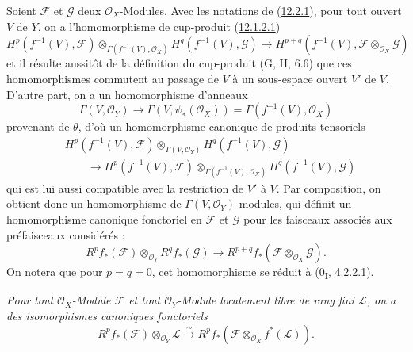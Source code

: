 \begin{env}[12.2.2]
\label{0.12.2.2-fr}
Soient $\mathcal F$ et $\mathcal G$ deux $\mathcal O_X$-Modules. Avec les
notations de (\hyperref[0.12.2.1-fr]{12.2.1}), pour tout ouvert $V$ de $Y$,
on a l'homomorphisme de cup-produit
(\hyperref[0.12.1.2.1-fr]{12.1.2.1})
\[
H^p(f^{-1}(V),\mathcal F)
\otimes_{\Gamma(f^{-1}(V),\mathcal O_X)}
H^q(f^{-1}(V),\mathcal G)
\longrightarrow
H^{p+q}(f^{-1}(V),\mathcal F\otimes_{\mathcal O_X}\mathcal G)
\]
et il résulte aussitôt de la définition du cup-produit (G, II, 6.6) que ces
homomorphismes commutent au passage de $V$ à un sous-espace ouvert $V'$ de
$V$. D'autre part, on a un homomorphisme d'anneaux
\[
\Gamma(V,\mathcal O_Y)\longrightarrow\Gamma(V,\psi_*(\mathcal O_X))
=\Gamma(f^{-1}(V),\mathcal O_X)
\]
provenant de $\theta$, d'où un homomorphisme canonique de produits tensoriels
\[
\begin{aligned}
&H^p(f^{-1}(V),\mathcal F)\otimes_{\Gamma(V,\mathcal O_Y)}
H^q(f^{-1}(V),\mathcal G)\\
&\qquad\longrightarrow
H^p(f^{-1}(V),\mathcal F)
\otimes_{\Gamma(f^{-1}(V),\mathcal O_X)}
H^q(f^{-1}(V),\mathcal G)
\end{aligned}
\]
qui est lui aussi compatible avec la restriction de $V'$ à $V$. Par
composition, on obtient donc un homomorphisme de
$\Gamma(V,\mathcal O_Y)$-modules, qui définit un homomorphisme canonique
fonctoriel en $\mathcal F$ et $\mathcal G$ pour les faisceaux associés aux
préfaisceaux considérés :
\[
\label{0.12.2.2.1-fr}
\tag{12.2.2.1}
R^p f_*(\mathcal F)\otimes_{\mathcal O_Y}R^q f_*(\mathcal G)
\longrightarrow
R^{p+q}f_*(\mathcal F\otimes_{\mathcal O_X}\mathcal G).
\]
On notera que pour $p=q=0$, cet homomorphisme se réduit à
(\hyperref[0.4.2.2.1-fr]{0\textsubscript{I}, 4.2.2.1}).
\end{env}

\begin{proposition}[12.2.3]
\label{0.12.2.3-fr}
\emph{Pour tout $\mathcal O_X$-Module $\mathcal F$ et tout
$\mathcal O_Y$-Module localement libre de rang fini $\mathcal L$, on a des
isomorphismes canoniques fonctoriels
\[
\label{0.12.2.3.1-fr}
\tag{12.2.3.1}
R^p f_*(\mathcal F)\otimes_{\mathcal O_Y}\mathcal L
\xrightarrow{\sim}
R^p f_*(\mathcal F\otimes_{\mathcal O_X}f^*(\mathcal L)).
\]}
\end{proposition}

